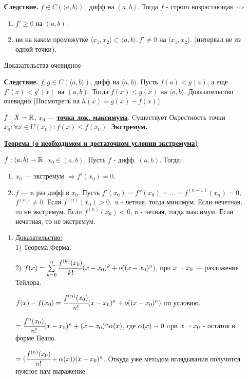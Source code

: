 \documentclass{article}
\newcommand{\deff}[1]{\underline{\textbf{#1}}}
\newcommand{\thmm}[1]{\underline{\textbf{#1}}}
\newcommand{\prooff}[1]{{\underline{Доказательство:}} \\ }
\begin{document}
\textbf{Следствие.} $f\in C(\langle a,b \rangle),$ дифф на $(a,b)$. Тогда $f$ - строго возрастающая $\Leftrightarrow$

\begin{enumerate}
    \item $f'\geq 0$ на $(a,b)$.
    \item ни на каком промежутке $\langle x_1,x_2\rangle \subset \langle a,b \rangle, f' \neq 0 $ на $\langle x_1,x_2 \rangle$. (интервал не из одной точки).
\end{enumerate}

Доказательства очевидное

\textbf{Следствие.} $f,g \in C(\langle a,b\rangle)$, дифф на $\langle a,b)$. Пусть $f(a)< g(a)$, а еще $f'(x)<g'(x)$ на $(a,b)$. Тогда $f(x)\leq g(x) $ на $\langle a,b\rangle$. Доказательство очевидно (Посмотреть на $h(x) = g(x)-f(x)$)

$f: X \shortrightarrow \mathbb{R}$, $x_0$ --- \deff{точка лок. максимума}. Cуществует Окрестность точки $x_0: \forall x \in U(x_0): f(x)\leq f(x_0)$. \deff{Экстремум.}

\thmm{Теорема (о необходимом и достаточном условии экстремума)}

$f: \langle a,b \rangle \shortrightarrow \mathbb{R}$. $x_0 \in (a,b)$. Пусть $f$ - дифф. $(a,b)$. Тогда:

\begin{enumerate}
    \item $x_0$ --- экстремум $\Rightarrow f'(x_0) = 0$.
    \item $f$ --- n раз дифф в $x_0$. Пусть $f'(x_0)=f''(x_0)=\ldots =f^{(n-1)}(x_n)=0$, $f^{(n)}\neq 0$. Если $f^{(n)}(x_0)>0,$ n - четная, тогда минимум. Если нечетная, то не экстремум. Если   $f^{(n)}(x_0)<0$, n - четная, тогда максимум. Если нечетная, то не экстремум.
\end{enumerate}

\begin{enumerate}
    \item[] \prooff{}
    1) Теорема Ферма.

    2) $f(x) = \sum\limits_{k=0}^n \cfrac{f^{(k)}(x_0)}{k!}(x-x_0)^k + o((x-x_0)^n)$, при $x\shortrightarrow x_0$ --- разложение Тейлора.

    $f(x) -f(x_0)= \cfrac{f^{(n)}(x_0)}{n!}(x-x_0)^n + o((x-x_0)^n)$ по условию.

    $=\cfrac{f^{n}(x_0)}{n!}(x-x_0)^n + (x-x_0)^n \alpha(x)$, где $\alpha(x) \shortrightarrow 0 $  при $x\shortrightarrow x_0$ - остаток в форме Пеано.

    $= (\cfrac{f^{(n)}(x_0)}{n!} + \alpha(x))(x-x_0)^n$. Откуда уже методом вглядывания получится нужное нам выражение.
\end{enumerate}
\end{document}
